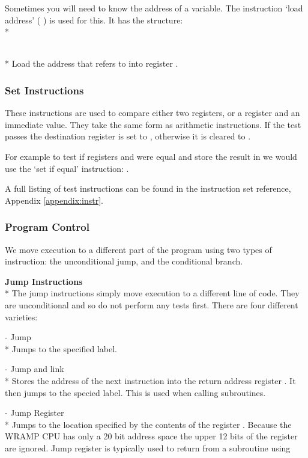 Sometimes you will need to know the address of a variable.  The 
instruction `load address' (  ) is used for this. It has the 
structure:
\\*

 \\*
Load the address that  refers to into register \regd.  

\subsubsection{Set Instructions}
These instructions are used to compare either two registers, or a
register and an immediate value.  They take the same form as
arithmetic instructions.  If the test passes the destination register
is set to , otherwise it is cleared to .

For example to test if registers  and  were equal and store the
result in  we would use the `set if equal' instruction: 
.

A full listing of test instructions can be found in the instruction set reference, Appendix \ref{appendix:instr}.

\subsubsection{Program Control}
We move execution to a different part of the program using two types of 
instruction: the unconditional jump, and the conditional branch.  

\textbf{Jump Instructions}\\*
The jump instructions simply move execution to a different line of
code.  They are unconditional and so do not perform any tests first.
There are four different varieties:

  - Jump\\*
Jumps to the specified label.

 - Jump and link\\*
Stores the address of the next instruction into the return address register . It then jumps to the specied label. This is used when calling subroutines.

  -  Jump Register\\*
Jumps to the location specified by the contents of the register \regs.  
Because the WRAMP CPU has only a 20 bit address space the upper 12 bits 
of the register are ignored.  Jump register is typically used to 
return from a subroutine using 

